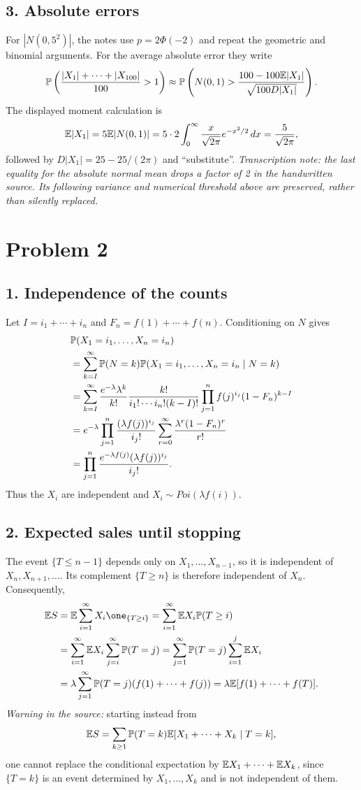 \documentclass[a4paper]{article}
\begin{document}
\subsection*{3. Absolute errors}
For $|N(0,5^2)|$, the notes use $p=2\Phi(-2)$ and repeat the geometric and binomial arguments. For the average absolute error they write
\[\P\left(\frac{|X_1|+\cdots+|X_{100}|}{100}>1\right)
\approx\P\left(N(0,1)>\frac{100-100\E|X_1|}{\sqrt{100D|X_1|}}\right).\]
The displayed moment calculation is
\[\E|X_1|=5\E|N(0,1)|=5\cdot2\int_0^\infty\frac{x}{\sqrt{2\pi}}e^{-x^2/2}\,dx=\frac5{\sqrt{2\pi}},\]
followed by $D|X_1|=25-25/(2\pi)$ and ``substitute''.
\noindent\textit{Transcription note: the last equality for the absolute normal mean drops a factor of 2 in the handwritten source. Its following variance and numerical threshold above are preserved, rather than silently replaced.}
\section*{Problem 2}
\subsection*{1. Independence of the counts}
Let $I=i_1+\cdots+i_n$ and $F_n=f(1)+\cdots+f(n)$. Conditioning on $N$ gives
\begin{align*}
&\P(X_1=i_1,\dots,X_n=i_n)\\
&=\sum_{k=I}^\infty\P(N=k)\P(X_1=i_1,\dots,X_n=i_n\mid N=k)\\
&=\sum_{k=I}^\infty\frac{e^{-\lambda}\lambda^k}{k!}
\frac{k!}{i_1!\cdots i_n!(k-I)!}\prod_{j=1}^nf(j)^{i_j}(1-F_n)^{k-I}\\
&=e^{-\lambda}\prod_{j=1}^n\frac{(\lambda f(j))^{i_j}}{i_j!}
\sum_{r=0}^\infty\frac{\lambda^r(1-F_n)^r}{r!}\\
&=\prod_{j=1}^n\frac{e^{-\lambda f(j)}(\lambda f(j))^{i_j}}{i_j!}.
\end{align*}
Thus the $X_i$ are independent and $X_i\sim Poi(\lambda f(i))$.
\subsection*{2. Expected sales until stopping}
The event $\{T\le n-1\}$ depends only on $X_1,\dots,X_{n-1}$, so it is independent of $X_n,X_{n+1},\dots$. Its complement $\{T\ge n\}$ is therefore independent of $X_n$. Consequently,
\begin{align*}
\E S&=\E\sum_{i=1}^\infty X_i\one_{\{T\ge i\}}
=\sum_{i=1}^\infty\E X_i\P(T\ge i)\\
&=\sum_{i=1}^\infty\E X_i\sum_{j=i}^\infty\P(T=j)
=\sum_{j=1}^\infty\P(T=j)\sum_{i=1}^j\E X_i\\
&=\lambda\sum_{j=1}^\infty\P(T=j)(f(1)+\cdots+f(j))
=\lambda\E[f(1)+\cdots+f(T)].
\end{align*}
\textit{Warning in the source:} starting instead from
\[\E S=\sum_{k\ge1}\P(T=k)\E[X_1+\cdots+X_k\mid T=k],\]
one cannot replace the conditional expectation by $\E X_1+\cdots+\E X_k$, since $\{T=k\}$ is an event determined by $X_1,\dots,X_k$ and is not independent of them.
\end{document}
